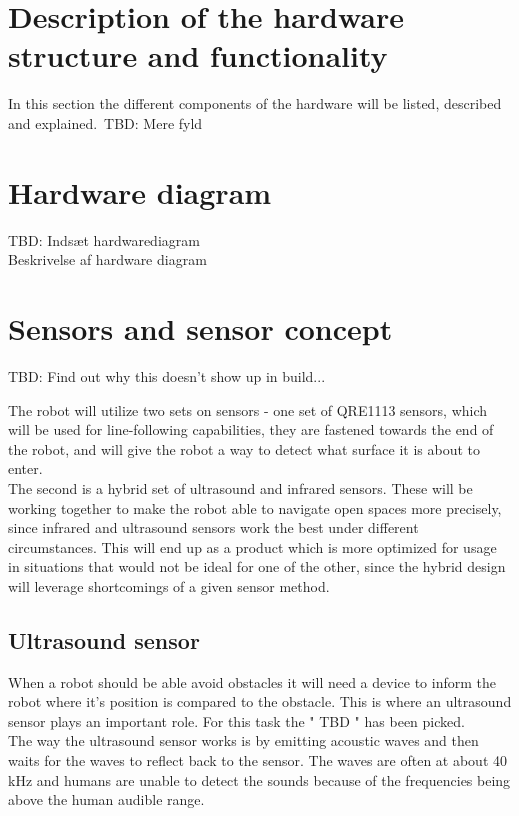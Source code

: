 \section{Description of the hardware structure and functionality}

In this section the different components of the hardware will be listed, described and explained.\
TBD: Mere fyld

\section{Hardware diagram}

TBD: Indsæt hardwarediagram\\
Beskrivelse af hardware diagram\\

\section{Sensors and sensor concept}

TBD: Find out why this doesn't show up in build...

The robot will utilize two sets on sensors - one set of QRE1113 sensors, which will be used for line-following capabilities, they are fastened towards the end of the robot, and will give the robot a way to detect what surface it is about to enter.\\
The second is a hybrid set of ultrasound and infrared sensors. These will be working together to make the robot able to navigate open spaces more precisely, since infrared and ultrasound sensors work the best under different circumstances. This will end up as a product which is more optimized for usage in situations that would not be ideal for one of the other, since the hybrid design will leverage shortcomings of a given sensor method.\\

\subsection{Ultrasound sensor}
When a robot should be able avoid obstacles it will need a device to inform the robot where it's position is compared to the obstacle. This is where an ultrasound sensor plays an important role. For this task the " TBD " has been picked.\\

The way the ultrasound sensor works is by emitting acoustic waves and then waits for the waves to reflect back to the sensor. The waves are often at about 40 kHz and humans are unable to detect the sounds because of the frequencies being above the human audible range.\\


